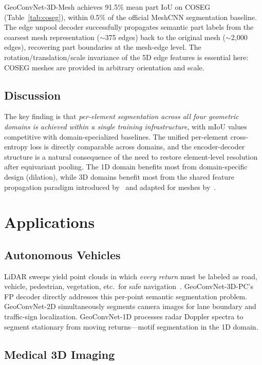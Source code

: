 \documentclass[10pt,conference]{IEEEtran}
\begin{document}
GeoConvNet-3D-Mesh achieves 91.5\% mean part IoU on COSEG
(Table~\ref{tab:coseg}), within 0.5\% of the official MeshCNN
segmentation baseline.  The edge unpool decoder successfully propagates
semantic part labels from the coarsest mesh representation ($\sim$375
edges) back to the original mesh ($\sim$2{,}000 edges), recovering part
boundaries at the mesh-edge level.  The rotation/translation/scale
invariance of the 5D edge features is essential here: COSEG meshes are
provided in arbitrary orientation and scale.

\subsection{Discussion}

The key finding is that \emph{per-element segmentation across all four
geometric domains is achieved within a single training infrastructure},
with mIoU values competitive with domain-specialized baselines.  The
unified per-element cross-entropy loss is directly comparable across
domains, and the encoder-decoder structure is a natural consequence of
the need to restore element-level resolution after equivariant pooling.
The 1D domain benefits most from domain-specific design (dilation), while
3D domains benefit most from the shared feature propagation paradigm
introduced by~\cite{qi2017pointnetplusplus} and adapted for meshes
by~\cite{hanocka2019meshcnn}.

\section{Applications}
\label{sec:applications}

\subsection{Autonomous Vehicles}

LiDAR sweeps yield point clouds in which \emph{every return} must be
labeled as road, vehicle, pedestrian, vegetation, etc.\ for safe
navigation~\cite{li2020deep}.  GeoConvNet-3D-PC's FP decoder directly
addresses this per-point semantic segmentation problem.  GeoConvNet-2D
simultaneously segments camera images for lane boundary and traffic-sign
localization.  GeoConvNet-1D processes radar Doppler spectra to segment
stationary from moving returns---motif segmentation in the 1D domain.

\subsection{Medical 3D Imaging}
\end{document}
